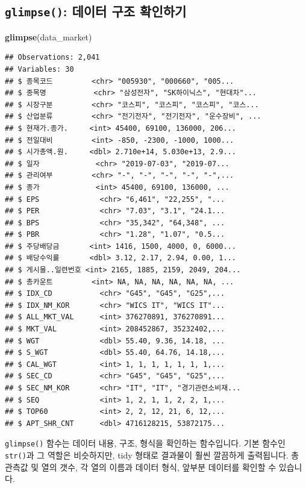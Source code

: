 \documentclass[12pt,]{book}
\newenvironment{Shaded}{\begin{snugshade}}{\end{snugshade}}
\newcommand{\KeywordTok}[1]{\textcolor[rgb]{0.13,0.29,0.53}{\textbf{#1}}}
\newcommand{\NormalTok}[1]{#1}
\begin{document}
\hypertarget{glimpse---}{%
\subsection{\texorpdfstring{\texttt{glimpse()}: 데이터 구조 확인하기}{glimpse(): 데이터 구조 확인하기}}\label{glimpse---}}

\begin{Shaded}
\begin{Highlighting}[]
\KeywordTok{glimpse}\NormalTok{(data_market)}
\end{Highlighting}
\end{Shaded}

\begin{verbatim}
## Observations: 2,041
## Variables: 30
## $ 종목코드         <chr> "005930", "000660", "005...
## $ 종목명           <chr> "삼성전자", "SK하이닉스", "현대차"...
## $ 시장구분         <chr> "코스피", "코스피", "코스피", "코스...
## $ 산업분류         <chr> "전기전자", "전기전자", "운수장비", ...
## $ 현재가.종가.     <int> 45400, 69100, 136000, 206...
## $ 전일대비         <int> -850, -2300, -1000, 1000...
## $ 시가총액.원.     <dbl> 2.710e+14, 5.030e+13, 2.9...
## $ 일자             <chr> "2019-07-03", "2019-07...
## $ 관리여부         <chr> "-", "-", "-", "-", "-",...
## $ 종가             <int> 45400, 69100, 136000, ...
## $ EPS              <chr> "6,461", "22,255", "...
## $ PER              <chr> "7.03", "3.1", "24.1...
## $ BPS              <chr> "35,342", "64,348", ...
## $ PBR              <chr> "1.28", "1.07", "0.5...
## $ 주당배당금       <int> 1416, 1500, 4000, 0, 6000...
## $ 배당수익률       <dbl> 3.12, 2.17, 2.94, 0.00, 1...
## $ 게시물..일련번호 <int> 2165, 1885, 2159, 2049, 204...
## $ 총카운트         <int> NA, NA, NA, NA, NA, NA, ...
## $ IDX_CD           <chr> "G45", "G45", "G25",...
## $ IDX_NM_KOR       <chr> "WICS IT", "WICS IT"...
## $ ALL_MKT_VAL      <int> 376270891, 376270891...
## $ MKT_VAL          <int> 208452867, 35232402,...
## $ WGT              <dbl> 55.40, 9.36, 14.18, ...
## $ S_WGT            <dbl> 55.40, 64.76, 14.18,...
## $ CAL_WGT          <int> 1, 1, 1, 1, 1, 1, 1,...
## $ SEC_CD           <chr> "G45", "G45", "G25",...
## $ SEC_NM_KOR       <chr> "IT", "IT", "경기관련소비재...
## $ SEQ              <int> 1, 2, 1, 1, 2, 2, 1,...
## $ TOP60            <int> 2, 2, 12, 21, 6, 12,...
## $ APT_SHR_CNT      <dbl> 4716128215, 53872175...
\end{verbatim}

\texttt{glimpse()} 함수는 데이터 내용, 구조, 형식을 확인하는 함수입니다. 기본 함수인 \texttt{str()}과 그 역할은 비슷하지만, tidy 형태로 결과물이 훨씬 깔끔하게 출력됩니다. 총 관측값 및 열의 갯수, 각 열의 이름과 데이터 형식, 앞부분 데이터를 확인할 수 있습니다.
\end{document}

